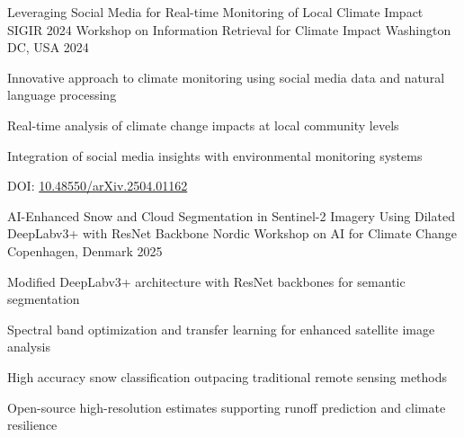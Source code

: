 
\begin{cventries}

  \cventry
    {Leveraging Social Media for Real-time Monitoring of Local Climate Impact} %
    {SIGIR 2024 Workshop on Information Retrieval for Climate Impact} %
    {Washington DC, USA} %
    {2024} %
    {
      \begin{cvitems}
        \item {Innovative approach to climate monitoring using social media data and natural language processing}
        \item {Real-time analysis of climate change impacts at local community levels}
        \item {Integration of social media insights with environmental monitoring systems}
        \item {DOI: \href{http://dx.doi.org/10.48550/arXiv.2504.01162}{10.48550/arXiv.2504.01162}}
      \end{cvitems}
    }

  \cventry
    {AI-Enhanced Snow and Cloud Segmentation in Sentinel-2 Imagery Using Dilated DeepLabv3+ with ResNet Backbone} %
    {Nordic Workshop on AI for Climate Change} %
    {Copenhagen, Denmark} %
    {2025} %
    {
      \begin{cvitems}
        \item {Modified DeepLabv3+ architecture with ResNet backbones for semantic segmentation}
        \item {Spectral band optimization and transfer learning for enhanced satellite image analysis}
        \item {High accuracy snow classification outpacing traditional remote sensing methods}
        \item {Open-source high-resolution estimates supporting runoff prediction and climate resilience}
      \end{cvitems}
    }

\end{cventries}